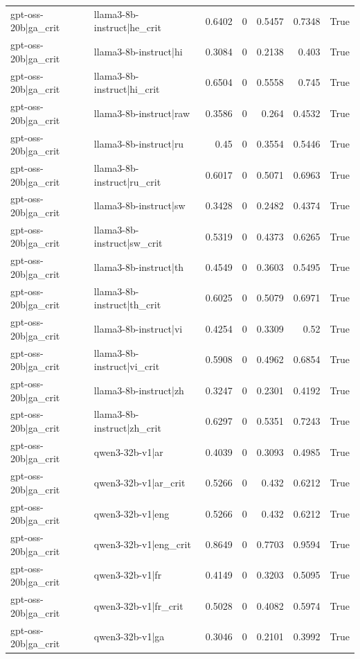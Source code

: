 \begin{table}
\begin{tabular}{l l r r r r l}
gpt-oss-20b|ga_crit & llama3-8b-instruct|he_crit & 0.6402 & 0 & 0.5457 & 0.7348 & True \\
gpt-oss-20b|ga_crit & llama3-8b-instruct|hi & 0.3084 & 0 & 0.2138 & 0.403 & True \\
gpt-oss-20b|ga_crit & llama3-8b-instruct|hi_crit & 0.6504 & 0 & 0.5558 & 0.745 & True \\
gpt-oss-20b|ga_crit & llama3-8b-instruct|raw & 0.3586 & 0 & 0.264 & 0.4532 & True \\
gpt-oss-20b|ga_crit & llama3-8b-instruct|ru & 0.45 & 0 & 0.3554 & 0.5446 & True \\
gpt-oss-20b|ga_crit & llama3-8b-instruct|ru_crit & 0.6017 & 0 & 0.5071 & 0.6963 & True \\
gpt-oss-20b|ga_crit & llama3-8b-instruct|sw & 0.3428 & 0 & 0.2482 & 0.4374 & True \\
gpt-oss-20b|ga_crit & llama3-8b-instruct|sw_crit & 0.5319 & 0 & 0.4373 & 0.6265 & True \\
gpt-oss-20b|ga_crit & llama3-8b-instruct|th & 0.4549 & 0 & 0.3603 & 0.5495 & True \\
gpt-oss-20b|ga_crit & llama3-8b-instruct|th_crit & 0.6025 & 0 & 0.5079 & 0.6971 & True \\
gpt-oss-20b|ga_crit & llama3-8b-instruct|vi & 0.4254 & 0 & 0.3309 & 0.52 & True \\
gpt-oss-20b|ga_crit & llama3-8b-instruct|vi_crit & 0.5908 & 0 & 0.4962 & 0.6854 & True \\
gpt-oss-20b|ga_crit & llama3-8b-instruct|zh & 0.3247 & 0 & 0.2301 & 0.4192 & True \\
gpt-oss-20b|ga_crit & llama3-8b-instruct|zh_crit & 0.6297 & 0 & 0.5351 & 0.7243 & True \\
gpt-oss-20b|ga_crit & qwen3-32b-v1|ar & 0.4039 & 0 & 0.3093 & 0.4985 & True \\
gpt-oss-20b|ga_crit & qwen3-32b-v1|ar_crit & 0.5266 & 0 & 0.432 & 0.6212 & True \\
gpt-oss-20b|ga_crit & qwen3-32b-v1|eng & 0.5266 & 0 & 0.432 & 0.6212 & True \\
gpt-oss-20b|ga_crit & qwen3-32b-v1|eng_crit & 0.8649 & 0 & 0.7703 & 0.9594 & True \\
gpt-oss-20b|ga_crit & qwen3-32b-v1|fr & 0.4149 & 0 & 0.3203 & 0.5095 & True \\
gpt-oss-20b|ga_crit & qwen3-32b-v1|fr_crit & 0.5028 & 0 & 0.4082 & 0.5974 & True \\
gpt-oss-20b|ga_crit & qwen3-32b-v1|ga & 0.3046 & 0 & 0.2101 & 0.3992 & True \\

\end{tabular}
\end{table}
